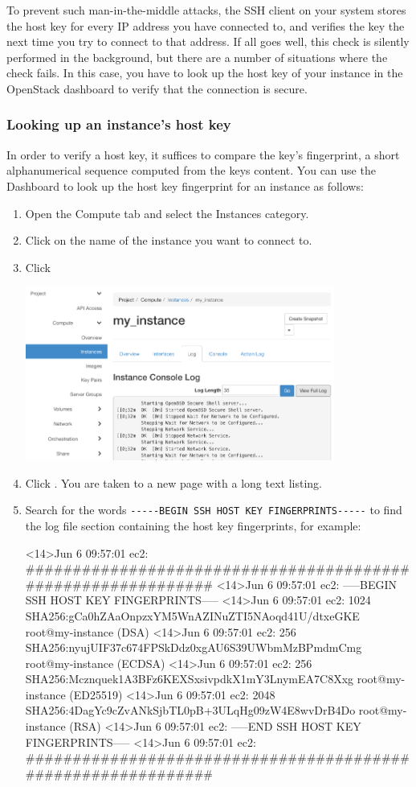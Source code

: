 To prevent such man-in-the-middle attacks, the SSH client on your
system stores the host key for every IP address you have connected to,
and verifies the key the next time you try to connect to that address.
If all goes well, this check is silently performed in the background,
but there are a number of situations where the check fails.  In this
case, you have to look up the host key of your instance in the
OpenStack dashboard to verify that the connection is secure.

\subsubsection*{Looking up an instance's host
  key}\label{sec:look-up-hostkey}
In order to verify a host key, it suffices to compare the key's
fingerprint, a short alphanumerical sequence computed from the keys
content.  You can use the Dashboard to look up the host key
fingerprint for an instance as follows:
\begin{enumerate}
\item Open the Compute tab and select the Instances category.
\item Click on the name of the instance you want to connect to.
\item Click 
  \begin{center}
    \includegraphics[width=0.8\textwidth]{img/instance_log}
  \end{center}

\item Click .  You are taken to a new page with a long text listing.
\item Search for the words \lstinline{-----BEGIN SSH HOST KEY FINGERPRINTS-----} to find the log file section containing the host key fingerprints, for example:
\begin{code}{}
<14>Jun  6 09:57:01 ec2: #############################################################
<14>Jun  6 09:57:01 ec2: -----BEGIN SSH HOST KEY FINGERPRINTS-----
<14>Jun  6 09:57:01 ec2: 1024 SHA256:gCa0hZAaOnpzxYM5WnAZINuZTI5NAoqd41U/dtxeGKE root@my-instance (DSA)
<14>Jun  6 09:57:01 ec2: 256 SHA256:nyujUIF37c674FPSkDdz0xgAU6S39UWbmMzBPmdmCmg root@my-instance (ECDSA)
<14>Jun  6 09:57:01 ec2: 256 SHA256:Mcznquek1A3BFz6KEXSxsivpdkX1mY3LnymEA7C8Xxg root@my-instance (ED25519)
<14>Jun  6 09:57:01 ec2: 2048 SHA256:4DagYc9cZvANkSjbTL0pB+3ULqHg09zW4E8wvDrB4Do root@my-instance (RSA)
<14>Jun  6 09:57:01 ec2: -----END SSH HOST KEY FINGERPRINTS-----
<14>Jun  6 09:57:01 ec2: #############################################################
\end{code}
\end{enumerate}

